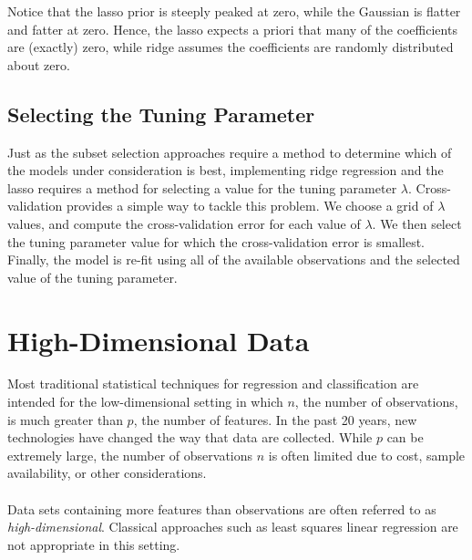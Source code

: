 Notice that the lasso prior is steeply peaked at zero, while the Gaussian is flatter and fatter at zero. Hence, the lasso expects a priori that many of the coefficients are (exactly) zero, while ridge assumes the coefficients are randomly distributed about zero.

\subsection{Selecting the Tuning Parameter}
Just as the subset selection approaches require a method to determine which of the models under consideration is best, implementing ridge regression and the lasso requires a method for selecting a value for the tuning parameter $\lambda$. Cross-validation provides a simple way to tackle this problem. We choose a grid of $\lambda$ values, and compute the cross-validation error for each value of $\lambda$. We then select the tuning parameter value for which the cross-validation error is smallest. Finally, the model is re-fit using all of the available observations and the selected value of the tuning parameter.

\section{High-Dimensional Data}
Most traditional statistical techniques for regression and classification are intended for the low-dimensional setting in which $n$, the number of observations, is much greater than $p$, the number of features. In the past 20 years, new technologies have changed the way that data are collected. While $p$ can be extremely large, the number of observations $n$ is often limited due to cost, sample availability, or other considerations.\\\\
Data sets containing more features than observations are often referred
to as \textit{high-dimensional}. Classical approaches such as least squares linear regression are not appropriate in this setting.

